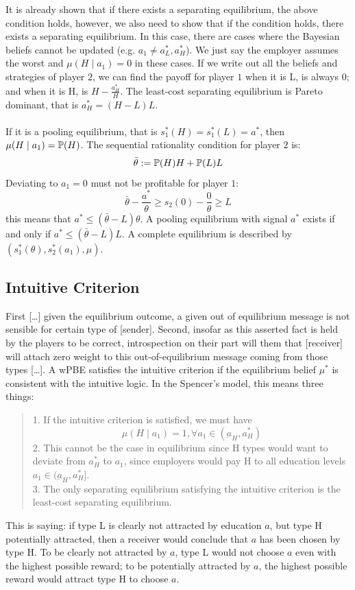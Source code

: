 It is already shown that if there exists a separating equilibrium, the above condition holds, however, we also need to show that if the condition holds, there exists a separating equilibrium. In this case, there are cases where the Bayesian beliefs cannot be updated (e.g. $a_1 \ne a_L^*, a_H^*$). We just say the employer assumes the worst and $\mu(H \mid a_1) = 0$ in these cases. If we write out all the beliefs and strategies of player $2$, we can find the payoff for player $1$ when it is L, is always $0$; and when it is H, is $H - \frac{a_H^*}{H}$. The least-cost separating equilibrium is Pareto dominant, that is $a_H^* = (H-L)L$. \\
\bigskip \\
If it is a pooling equilibrium, that is $s_1^*(H) = s_1^*(L) = a^*$, then $\mu(H \mid a_1) = \mathbb{P}(H)$. The sequential rationality condition for player $2$ is:
$$\bar{\theta} := \mathbb{P}(H)H + \mathbb{P}(L)L$$
Deviating to $a_1 = 0$ must not be profitable for player $1$:
$$\bar{\theta} - \frac{a^*}{\theta} \ge s_2(0) - \frac{0}{\theta} \ge L$$
this means that $a^* \le (\bar{\theta} - L)\theta$. A pooling equilibrium with signal $a^*$ exists if and only if $a^* \le (\bar{\theta} - L)L$. A complete equilibrium is described by $(s_1^*(\theta), s_2^*(a_1), \mu)$.

\subsection{Intuitive Criterion}
First [\dots] given the equilibrium outcome, a given out of equilibrium message is not sensible for certain type of [sender]. Second, insofar as this asserted fact is held by the players to be correct, introspection on their part will them that [receiver] will attach zero weight to this out-of-equilibrium message coming from those types [\dots]. A wPBE satisfies the intuitive criterion if the equilibrium belief $\mu^*$ is consistent with the intuitive logic. In the Spencer's model, this means three things:
\begin{quote}
    1. If the intuitive criterion is satisfied, we must have
    $$\mu(H \mid a_1) = 1, \forall a_1 \in (\underbar{a}_H, a_H^*)$$
    2. This cannot be the case in equilibrium since H types would want to deviate from $a_H^*$ to $a_1$, since employers would pay H to all education levels $a_1 \in (\underbar{a}_H, a_H^*]$. \\
    3. The only separating equilibrium satisfying the intuitive criterion is the least-cost separating equilibrium.
\end{quote}
This is saying: if type L is clearly not attracted by education $a$, but type H potentially attracted, then a receiver would conclude that $a$ has been chosen by type H. To be clearly not attracted by $a$, type L would not choose $a$ even with the highest possible reward; to be potentially attracted by $a$, the highest possible reward would attract type H to choose $a$.

